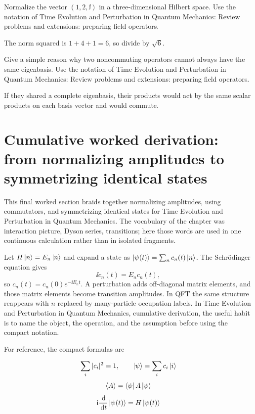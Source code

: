 \begin{exercise}
Normalize the vector \((1,2,\ii)\) in a three-dimensional Hilbert space.  Use the notation of Time Evolution and Perturbation in Quantum Mechanics: Review problems and extensions: preparing field operators.
\begin{answer}
The norm squared is \(1+4+1=6\), so divide by \(\sqrt6\).
\end{answer}
\end{exercise}

\begin{exercise}
Give a simple reason why two noncommuting operators cannot always have the same eigenbasis.  Use the notation of Time Evolution and Perturbation in Quantum Mechanics: Review problems and extensions: preparing field operators.
\begin{answer}
If they shared a complete eigenbasis, their products would act by the same scalar products on each basis vector and would commute.
\end{answer}
\end{exercise}



\section{Cumulative worked derivation: from normalizing amplitudes to symmetrizing identical states}

This final worked section braids together normalizing amplitudes, using commutators, and symmetrizing identical states for Time Evolution and Perturbation in Quantum Mechanics.  The vocabulary of the chapter was interaction picture, Dyson series, transitions; here those words are used in one continuous calculation rather than in isolated fragments.

Let \(H\left|n\right\rangle=E_n\left|n\right\rangle\) and expand a state as \(\left|\psi(t)\right\rangle=\sum_nc_n(t)\left|n\right\rangle\).  The Schrödinger equation gives
\[
  \ii\dot c_n(t)=E_nc_n(t),
\]
so \(c_n(t)=c_n(0)e^{-\ii E_nt}\).  A perturbation adds off-diagonal matrix elements, and those matrix elements become transition amplitudes.  In QFT the same structure reappears with \(n\) replaced by many-particle occupation labels.  In Time Evolution and Perturbation in Quantum Mechanics, cumulative derivation, the useful habit is to name the object, the operation, and the assumption before using the compact notation.

For reference, the compact formulas are

\[
  \sum_i |c_i|^2=1,\qquad \left|\psi\right\rangle=\sum_i c_i\left|i\right\rangle
\]
\[
  \left\langle A\right\rangle=\left\langle \psi\right|A\left|\psi\right\rangle
\]
\[
  \mathrm i\frac{\,\mathrm d}{\,\mathrm d t}\left|\psi(t)\right\rangle=H\left|\psi(t)\right\rangle
\]

